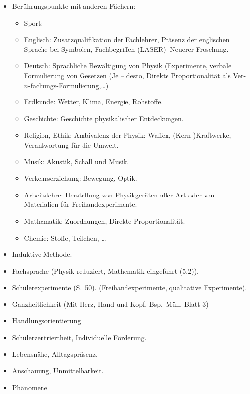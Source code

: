 \begin{itemize}
	\item
	Ber\"{u}hrungspunkte mit anderen F\"{a}chern:
	\begin{itemize}
		\item
		Sport:
		\item
		Englisch: Zusatzqualifikation der Fachlehrer,
		Pr\"{a}senz der englischen Sprache bei
		Symbolen, Fachbegriffen (LASER), Neuerer Froschung.
		\item
		Deutsch: Sprachliche Bew\"{a}ltigung von Physik (Experimente,
		verbale Formulierung von Gesetzen (Je -- desto,
		Direkte Proportionalit\"{a}t als Ver-$n$-fachungs-Formulierung,\dots)
		\item
		Erdkunde: Wetter, Klima, Energie, Rohstoffe.
		\item
		Geschichte: Geschichte physikalischer Entdeckungen.
		\item
		Religion, Ethik: Ambivalenz der Physik: Waffen,
		(Kern-)Kraftwerke, Verantwortung f\"{u}r die Umwelt.
		\item
		Musik: Akustik, Schall und Musik.
		\item
		Verkehrserziehung: Bewegung, Optik.
		\item
		Arbeitslehre: Herstellung von Physikger\"{a}ten
		aller Art oder von Materialien f\"{u}r Freihandexperimente.
		\item
		Mathematik: Zuordnungen, Direkte Proportionalit\"{a}t.
		\item
		Chemie: Stoffe, Teilchen, \dots
	\end{itemize}
\end{itemize}

\mip
{}

\begin{itemize}
	\item
	Induktive Methode.
	\item
	Fachsprache (Physik reduziert, Mathematik eingef\"{u}hrt (5.2)).
	
	\item
	Sch\"{u}lerexperimente (S.\ 50).
	(Freihandexperimente, qualitative Experimente).
	\item Ganzheitlichkeit (Mit Herz, Hand und Kopf, Bsp.\ M\"{u}ll, Blatt 3)
	\item Handlungsorientierung
	\item Sch\"{u}lerzentriertheit, Individuelle F\"{o}rderung.
	\item Lebensn\"{a}he, Alltagspr\"{a}senz.
	\item Anschauung, Unmittelbarkeit.
	\item Ph\"{a}nomene
\end{itemize}

